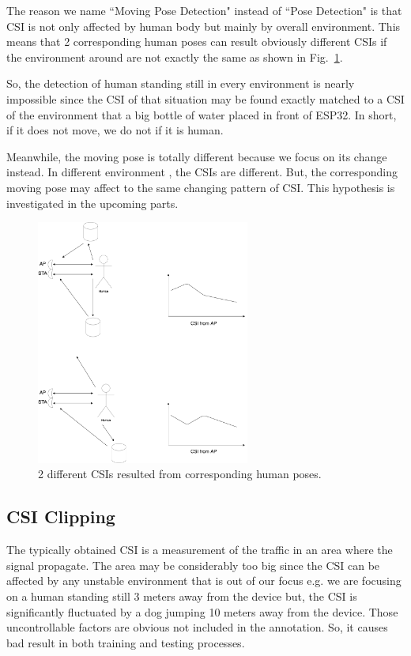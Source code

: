 \documentclass[conference]{IEEEtran}
\begin{document}
	The reason we name ``Moving Pose Detection" instead of ``Pose Detection" is that CSI is not only affected by human body but mainly by overall environment. This means that 2 corresponding human poses can result obviously different CSIs if the environment around are not exactly the same as shown in Fig.~\ref{fig:ESP32CSI02}.
	
	So, the detection of human standing still in every environment is nearly impossible since the CSI of that situation may be found exactly matched to a CSI of the environment that a big bottle of water placed in front of ESP32.
	In short, if it does not move, we do not if it is human.
	
	Meanwhile, the moving pose is totally different because we focus on its change instead. In different environment , the CSIs are  different. But, the corresponding moving pose may affect to the same changing pattern of CSI. This hypothesis is investigated in the upcoming parts.
	
	\begin{figure}[htbp]
		
		\centerline{\includegraphics[width=70mm,scale=0.5]{ESP32CSI02.png}}
		\caption{2 different CSIs resulted from corresponding human poses.}
		\label{fig:ESP32CSI02}
	\end{figure}
	
	\iffalse
	 \subsection{CSI Clipping}
	 
	 The typically obtained CSI is a measurement of the traffic in an area where the signal propagate. The area may be considerably too big since the CSI can be affected by any unstable environment that is out of our focus e.g. we are focusing on a human standing still 3 meters away from the device but, the CSI is significantly fluctuated by a dog jumping 10 meters away from the device. Those uncontrollable factors are obvious not included in the annotation. So, it causes bad result in both training and testing processes. 
	 
\end{document}
